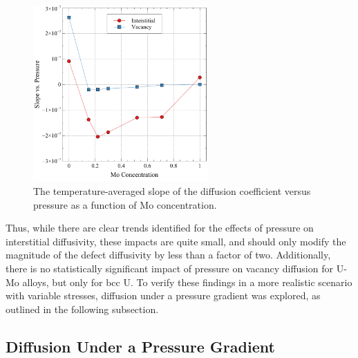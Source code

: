 \documentclass[review]{elsarticle}
\begin{document}
\begin{figure}[h!]
    \centering
    \includegraphics[width=0.6\textwidth]{avg_vs_p.pdf}
    \caption{The temperature-averaged slope of the diffusion coefficient versus pressure as a function of Mo concentration.}
    \label{fig:avg_vs_p}
\end{figure}

Thus, while there are clear trends identified for the effects of pressure on interstitial diffusivity, these impacts are quite small, and should only modify the magnitude of the defect diffusivity by less than a factor of two. Additionally, there is no statistically significant impact of pressure on vacancy diffusion for U-Mo alloys, but only for bcc U. To verify these findings in a more realistic scenario with variable stresses, diffusion under a pressure gradient was explored, as outlined in the following subsection. 

\FloatBarrier

\subsection{Diffusion Under a Pressure Gradient}
\end{document}
